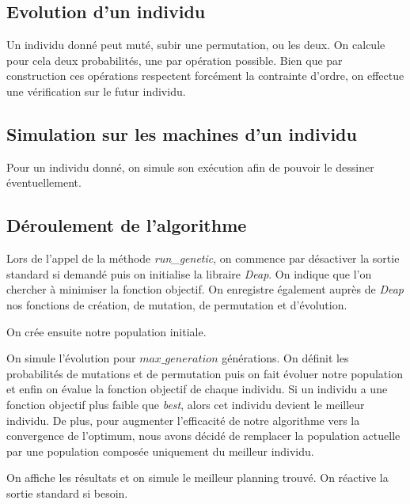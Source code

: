 \newpage

\subsection{Evolution d'un individu}



Un individu donné peut muté, subir une permutation, ou les deux. On calcule pour cela deux probabilités, une par opération possible. Bien que par construction ces opérations respectent forcément la contrainte d'ordre, on effectue une vérification sur le futur individu.

\subsection{Simulation sur les machines d'un individu}



Pour un individu donné, on simule son exécution afin de pouvoir le dessiner éventuellement.

\subsection{Déroulement de l'algorithme}



Lors de l'appel de la méthode \textit{run\_genetic}, on commence par désactiver la sortie standard si demandé puis on initialise la libraire \textit{Deap}. On indique que l'on chercher à minimiser la fonction objectif. On enregistre également auprès de \textit{Deap} nos fonctions de création, de mutation, de permutation et d'évolution.



On crée ensuite notre population initiale.



On simule l'évolution pour $max\_generation$ générations. On définit les probabilités de mutations et de permutation puis on fait évoluer notre population et enfin on évalue la fonction objectif de chaque individu. Si un individu a une fonction objectif plus faible que \textit{best}, alors cet individu devient le meilleur individu. De plus, pour augmenter l'efficacité de notre algorithme vers la convergence de l'optimum, nous avons décidé de remplacer la population actuelle par une population composée uniquement du meilleur individu.

\newpage



On affiche les résultats et on simule le meilleur planning trouvé. On réactive la sortie standard si besoin.